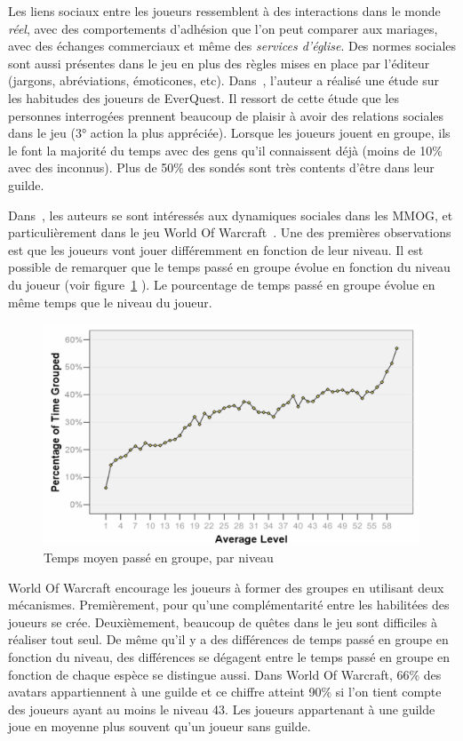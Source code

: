 \par Les liens sociaux entre les joueurs ressemblent à des interactions dans le monde \textit{réel}, avec des comportements d'adhésion que l'on peut comparer aux mariages, avec des échanges commerciaux et même des \textit{services d'église}. Des normes sociales sont aussi présentes dans le jeu en plus des règles mises en place par l'éditeur (jargons, abréviations, émoticones, etc). Dans~\cite{StudyEQ}, l'auteur a réalisé une étude sur les habitudes des joueurs de EverQuest. Il ressort de cette étude que les personnes interrogées prennent beaucoup de plaisir à avoir des relations sociales dans le jeu (3° action la plus appréciée). Lorsque les joueurs jouent en groupe, ils le font la majorité du temps avec des gens qu'il connaissent déjà (moins de 10\% avec des inconnus). Plus de 50\% des sondés sont très contents d'être dans leur guilde.


\par Dans~\cite{1124834}, les auteurs se sont intéressés aux dynamiques sociales dans les MMOG, et particulièrement dans le jeu World Of Warcraft~\cite{wow}. Une des premières observations est que les joueurs vont jouer différemment en fonction de leur niveau. Il est possible de remarquer que le temps passé en groupe évolue en fonction du niveau du joueur (voir figure~\ref{timespentgroup} ). Le pourcentage de temps passé en groupe évolue en même temps que le niveau du joueur.  
	\begin{figure}[!h]
        \centering
        \includegraphics[scale=0.85]{./Ressources/Images/timespentgroup.png}
        \caption{Temps moyen passé en groupe, par niveau}
        \label{timespentgroup}
        \end{figure}

\par World Of Warcraft encourage les joueurs à former des groupes en utilisant deux mécanismes. Premièrement, pour qu'une complémentarité entre les habilitées des joueurs se crée. Deuxièmement, beaucoup de quêtes dans le jeu sont difficiles à réaliser tout seul. De même qu'il y a des différences de temps passé en groupe en fonction du niveau, des différences se dégagent entre le temps passé en groupe en fonction de chaque espèce se distingue aussi. Dans World Of Warcraft, 66\% des avatars appartiennent à une guilde et ce chiffre atteint 90\% si l'on tient compte des joueurs ayant au moins le niveau 43. Les joueurs appartenant à une guilde joue en moyenne plus souvent qu'un joueur sans guilde. 

